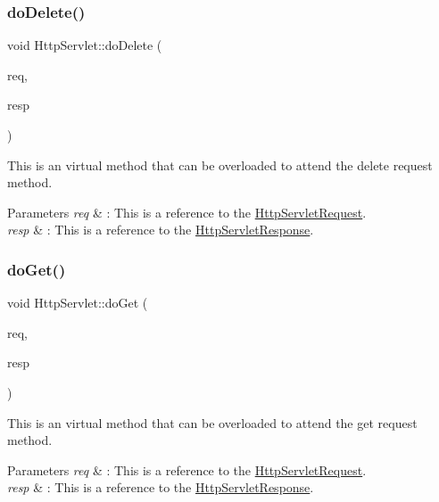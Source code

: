 \subsubsection{\texorpdfstring{do\+Delete()}{doDelete()}}
{\footnotesize\ttfamily void Http\+Servlet\+::do\+Delete (\begin{DoxyParamCaption}\item[{\mbox{\hyperlink{class_http_servlet_request}{Http\+Servlet\+Request}} \&}]{req,  }\item[{\mbox{\hyperlink{class_http_servlet_response}{Http\+Servlet\+Response}} \&}]{resp }\end{DoxyParamCaption})\hspace{0.3cm}{\ttfamily [virtual]}}



This is an virtual method that can be overloaded to attend the delete request method. 


\begin{DoxyParams}{Parameters}
{\em req} & \+: This is a reference to the \mbox{\hyperlink{class_http_servlet_request}{Http\+Servlet\+Request}}. \\
\hline
{\em resp} & \+: This is a reference to the \mbox{\hyperlink{class_http_servlet_response}{Http\+Servlet\+Response}}. \\
\hline
\end{DoxyParams}
\mbox{\label{class_http_servlet_a7c851e2989b7a61e5c8470b562690516}} 
\subsubsection{\texorpdfstring{do\+Get()}{doGet()}}
{\footnotesize\ttfamily void Http\+Servlet\+::do\+Get (\begin{DoxyParamCaption}\item[{\mbox{\hyperlink{class_http_servlet_request}{Http\+Servlet\+Request}} \&}]{req,  }\item[{\mbox{\hyperlink{class_http_servlet_response}{Http\+Servlet\+Response}} \&}]{resp }\end{DoxyParamCaption})\hspace{0.3cm}{\ttfamily [virtual]}}



This is an virtual method that can be overloaded to attend the get request method. 


\begin{DoxyParams}{Parameters}
{\em req} & \+: This is a reference to the \mbox{\hyperlink{class_http_servlet_request}{Http\+Servlet\+Request}}. \\
\hline
{\em resp} & \+: This is a reference to the \mbox{\hyperlink{class_http_servlet_response}{Http\+Servlet\+Response}}. \\
\hline
\end{DoxyParams}


